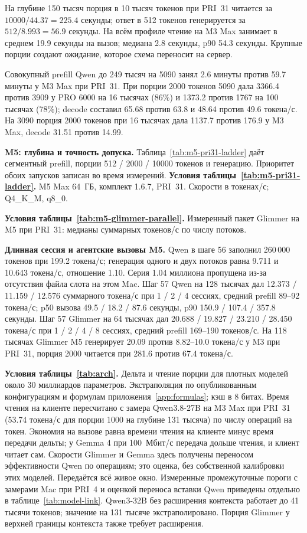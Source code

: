 На глубине 150 тысяч порция в 10 тысяч токенов при PRI~31 читается за $10000/44.37=225.4$ секунды;
ответ в 512 токенов генерируется за $512/8.993=56.9$ секунды. На всём профиле чтение на M3 Max занимает в среднем 19.9 секунды на вызов;
медиана 2.8 секунды, p90 54.3 секунды. Крупные порции создают ожидание,
которое схема переносит на сервер.


Совокупный prefill Qwen до 249 тысяч на 5090 занял 2.6 минуты против 59.7 минуты у M3 Max при PRI~31.
При порции 2000 токенов 5090 дала 3366.4 против 3909 у PRO 6000 на 16 тысячах (86\%) и 1373.2 против 1767
на 100 тысячах (78\%); decode составил 65.68 против 63.8 и 48.64 против 49.6 токена/с.
На 3090 порция 2000 токенов при 16 тысячах дала 1137.7 против 176.9 у M3 Max, decode 31.51 против 14.99.

\textbf{M5: глубина и точность допуска.} Таблица~\ref{tab:m5-pri31-ladder} даёт сегментный prefill,
порции 512 / 2000 / 10000 токенов и генерацию. Приоритет обоих запусков записан во время измерений.
\textbf{Условия таблицы~\ref{tab:m5-pri31-ladder}.} M5 Max 64~ГБ, комплект 1.6.7, PRI~31. Скорости в токенах/с; Q4\_K\_M, q8\_0.

\textbf{Условия таблицы~\ref{tab:m5-glimmer-parallel}.} Измеренный пакет Glimmer на M5 при PRI~31: медианы суммарных токенов/с по числу потоков.

\textbf{Длинная сессия и агентские вызовы M5.} Qwen в шаге 56 заполнил 260\,000 токенов при 199.2 токена/с;
генерация одного и двух потоков равна 9.711 и 10.643 токена/с, отношение 1.10.
Серия 1.04 миллиона пропущена из-за отсутствия файла слота на этом Mac.
Шаг 57 Qwen на 128 тысячах дал 12.373 / 11.159 / 12.576 суммарного токена/с
при 1 / 2 / 4 сессиях, средний prefill 89--92 токена/с;
p50 вызова 49.5 / 18.2 / 87.6 секунды, p90 150.9 / 107.4 / 357.8 секунды.
Шаг 57 Glimmer на 64 тысячах дал 20.688 / 19.827 / 23.210 / 28.450 токена/с
при 1 / 2 / 4 / 8 сессиях, средний prefill 169--190 токенов/с.
На 118 тысячах Glimmer M5 генерирует 20.09 против 8.82--10.0 токена/с у M3 при PRI~31,
порция 2000 читается при 281.6 против 67.4 токена/с.

\textbf{Условия таблицы~\ref{tab:arch}.} Дельта и чтение порции для плотных моделей около 30 миллиардов параметров. Экстраполяция по опубликованным
конфигурациям и формулам приложения~\ref{app:formulas}; кэш в 8 битах. Время чтения на клиенте пересчитано с замера
Qwen3.8-27B на M3 Max при PRI~31 (53.74 токена/с для порции 1000 на глубине 131 тысяча) по числу операций на токен. Экономия на вызове
равна времени чтения на клиенте минус время передачи дельты; у Gemma 4 при 100~Мбит/с передача дольше чтения, и клиент
читает сам. Скорости Glimmer и Gemma здесь получены переносом эффективности Qwen по операциям; это оценка,
без собственной калибровки этих моделей. Передаётся всё живое окно.
Измеренные промежуточные пороги с замерами Mac при PRI~4 и оценкой переноса вставки Qwen приведены отдельно в таблице~\ref{tab:model-link}.
Qwen3-32B без расширения контекста работает до 41 тысячи токенов; значение на 131 тысяче экстраполировано.
Порция Glimmer у верхней границы контекста также требует расширения.


